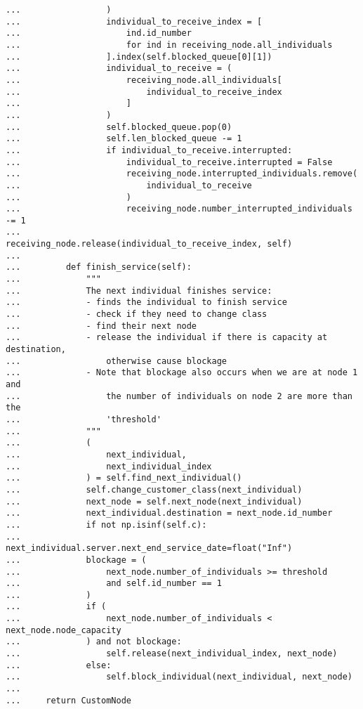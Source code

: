 \begin{lstlisting}[style=pystyle]
...                 )
...                 individual_to_receive_index = [
...                     ind.id_number
...                     for ind in receiving_node.all_individuals
...                 ].index(self.blocked_queue[0][1])
...                 individual_to_receive = (
...                     receiving_node.all_individuals[
...                         individual_to_receive_index
...                     ]
...                 )
...                 self.blocked_queue.pop(0)
...                 self.len_blocked_queue -= 1
...                 if individual_to_receive.interrupted:
...                     individual_to_receive.interrupted = False
...                     receiving_node.interrupted_individuals.remove(
...                         individual_to_receive
...                     )
...                     receiving_node.number_interrupted_individuals -= 1
...                 receiving_node.release(individual_to_receive_index, self)
...
...         def finish_service(self):
...             """
...             The next individual finishes service:
...             - finds the individual to finish service
...             - check if they need to change class
...             - find their next node
...             - release the individual if there is capacity at destination,
...                 otherwise cause blockage
...             - Note that blockage also occurs when we are at node 1 and
...                 the number of individuals on node 2 are more than the
...                 'threshold'
...             """
...             (
...                 next_individual,
...                 next_individual_index
...             ) = self.find_next_individual()
...             self.change_customer_class(next_individual)
...             next_node = self.next_node(next_individual)
...             next_individual.destination = next_node.id_number
...             if not np.isinf(self.c):
...                 next_individual.server.next_end_service_date=float("Inf")
...             blockage = (
...                 next_node.number_of_individuals >= threshold
...                 and self.id_number == 1
...             )
...             if (
...                 next_node.number_of_individuals < next_node.node_capacity
...             ) and not blockage:
...                 self.release(next_individual_index, next_node)
...             else:
...                 self.block_individual(next_individual, next_node)
...
...     return CustomNode

\end{lstlisting}

